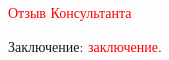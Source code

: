 \documentclass[fontsize=12pt]{diploma}
\begin{document}
\fillReviewHeader

\textcolor{red}{Отзыв Консультанта}

Заключение: \textcolor{red}{заключение}.

\makeReviewSignature
\end{document}
